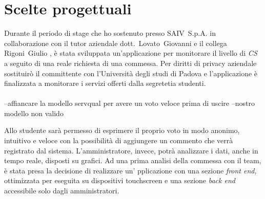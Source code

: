  \section{Scelte progettuali}
Durante il periodo di stage che ho sostenuto presso SAIV~S.p.A.
in collaborazione con il tutor aziendale dott.~Lovato~Giovanni e il collega
Rigoni~Giulio , è stata sviluppata un'applicazione per monitorare il livello di
\emph{CS} a seguito di una reale richiesta di una commessa. Per diritti di
privacy aziendale sostituirò il committente con l'Università degli studi di
Padova e l'applicazione è finalizzata a monitorare i servizi offerti dalla
segretetia studenti. 
\\\\
--affiancare la modello servqual per avere un voto veloce prima di uscire
--nostro modello non valido  

Allo studente sarà permesso di esprimere il proprio voto in modo anonimo,
intuitivo e veloce con la possibilità di aggiungere un commento che verrà registrato dal
sistema. L'amministratore, invece, potrà analizzare i dati, anche in tempo
reale, disposti su grafici. Ad una prima analisi della commessa con il team, è
stata presa la decisione di realizzare un' pplicazione con una sezione
\emph{front end}, ottimizzata per eseguita su dispositivi touchscreen e una
sezione \emph{back end} accessibile solo dagli amministratori.
